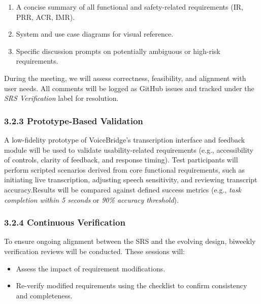 \documentclass[12pt, titlepage]{article}
\begin{document}
\begin{enumerate}
    \item A concise summary of all functional and safety-related requirements (IR, PRR, ACR, IMR).
    \item System and use case diagrams for visual reference.
    \item Specific discussion prompts on potentially ambiguous or high-risk requirements.
\end{enumerate}

During the meeting, we will assess correctness, feasibility, and alignment with user needs. All comments will be logged as GitHub issues and tracked under the \textit{SRS Verification} label for resolution.

\subsubsection*{3.2.3 Prototype-Based Validation}
A low-fidelity prototype of VoiceBridge’s transcription interface and feedback module will be used to validate usability-related requirements (e.g., accessibility of controls, clarity of feedback, and response timing). Test participants will perform scripted scenarios derived from core functional requirements, such as initiating live transcription, adjusting speech sensitivity, and reviewing transcript accuracy.Results will be compared against defined success metrics (e.g., \textit{task completion within 5 seconds} or \textit{90\% accuracy threshold}).

\subsubsection*{3.2.4 Continuous Verification}
To ensure ongoing alignment between the SRS and the evolving design, biweekly verification reviews will be conducted. These sessions will:
\begin{itemize}
    \item Assess the impact of requirement modifications.
    \item Re-verify modified requirements using the checklist to confirm consistency and completeness.
\end{itemize}
\end{document}
